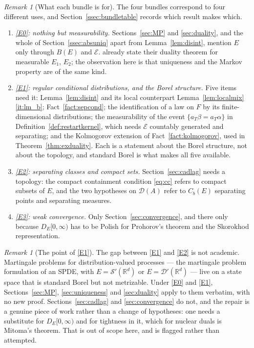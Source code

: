 \documentclass[11pt,a4paper]{article}
\theoremstyle{plain}
\theoremstyle{definition}
\theoremstyle{remark}
\newtheorem{remark}[theorem]{Remark}
\newcommand{\R}{\mathbb{R}}
\newcommand{\Bdd}{B}                           %
\newcommand{\Cb}{C_b}                          %
\newcommand{\DE}{D_E[0,\infty)}
\newcommand{\dom}{\mathcal{D}}                 %
\newcommand{\CPS}{\cite{CPS23}}
\begin{document}
\begin{remark}[What each bundle is for]
  \label{rem:Ebundleuse}
  The four bundles correspond to four different uses, and
  Section~\ref{ssec:bundletable} records which result makes which.
  \begin{enumerate}[label=(\roman*)]
  \item \emph{\eqref{E0}: nothing but measurability.}  Sections~\ref{sec:MP} and
    \ref{sec:duality}, and the whole of Section~\ref{ssec:absuniq} apart from
    Lemma~\ref{lem:disint}, mention $E$ only through $\Bdd(E)$ and $\mathcal{E}$.
    \CPS{} already state their duality theorem for measurable $E_1$, $E_2$; the
    observation here is that uniqueness and the Markov property are of the same
    kind.
  \item \emph{\eqref{E1}: regular conditional distributions, and the Borel structure.}
    Five items need it: Lemma~\ref{lem:disint} and its local counterpart
    Lemma~\ref{lem:localmix}\ref{it:lm_b}; Fact~\ref{fact:sepcond}; the
    identification of a law on $F$ by its finite-dimensional distributions;
    the measurability of the event
    $\{a_T\beta = a_T\alpha\}$ in Definition~\ref{def:restartkernel}, which needs
    $\mathcal{E}$ countably generated and separating; and the Kolmogorov extension
    of Fact~\ref{fact:kolmogorov}, used in Theorem~\ref{thm:exduality}.  Each is a
    statement about the Borel structure, not about the topology, and standard
    Borel is what makes all five available.
  \item \emph{\eqref{E2}: separating classes and compact sets.}
    Section~\ref{sec:cadlag} needs a topology: the compact containment condition
    \eqref{eq:cc} refers to compact subsets of $E$, and the two hypotheses on
    $\dom(A)$ refer to $\Cb(E)$ separating points and separating measures.
  \item \emph{\eqref{E3}: weak convergence.}  Only Section~\ref{sec:convergence}, and
    there only because $\DE$ has to be Polish for Prohorov's theorem and the
    Skorokhod representation.
  \end{enumerate}
\end{remark}

\begin{remark}[The point of \eqref{E1}]
  \label{rem:E1why}
  The gap between \eqref{E1} and \eqref{E2} is not academic.  Martingale problems for
  distribution-valued processes --- the martingale problem formulation of an
  SPDE, with $E = \mathcal{S}'(\R^d)$ or $E = \mathcal{D}'(\R^d)$ --- live on a
  state space that is standard Borel but not metrizable.  Under \eqref{E0} and \eqref{E1},
  Sections~\ref{sec:MP}, \ref{sec:uniqueness} and \ref{sec:duality} apply to them
  verbatim, with no new proof.  Sections~\ref{sec:cadlag} and
  \ref{sec:convergence} do not, and the repair is a genuine piece of work rather
  than a change of hypotheses: one needs a substitute for $\DE$ and for
  tightness in it, which for nuclear duals is Mitoma's theorem.  That is out of
  scope here, and is flagged rather than attempted.
\end{remark}
\end{document}
